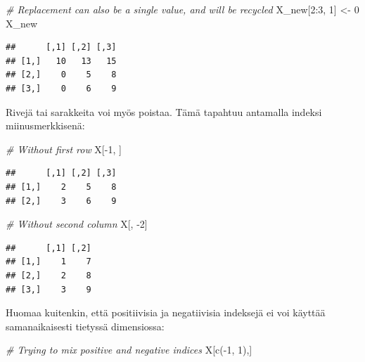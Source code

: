 \documentclass[
]{book}
\newenvironment{Shaded}{\begin{snugshade}}{\end{snugshade}}
\newcommand{\CommentTok}[1]{\textcolor[rgb]{0.56,0.35,0.01}{\textit{#1}}}
\newcommand{\DecValTok}[1]{\textcolor[rgb]{0.00,0.00,0.81}{#1}}
\newcommand{\FunctionTok}[1]{\textcolor[rgb]{0.00,0.00,0.00}{#1}}
\newcommand{\NormalTok}[1]{#1}
\newcommand{\OtherTok}[1]{\textcolor[rgb]{0.56,0.35,0.01}{#1}}
\newcommand{\SpecialCharTok}[1]{\textcolor[rgb]{0.00,0.00,0.00}{#1}}
\begin{document}
\begin{Shaded}
\begin{Highlighting}[]
\CommentTok{\# Replacement can also be a single value, and will be recycled}
\NormalTok{X\_new[}\DecValTok{2}\SpecialCharTok{:}\DecValTok{3}\NormalTok{, }\DecValTok{1}\NormalTok{] }\OtherTok{\textless{}{-}} \DecValTok{0}
\NormalTok{X\_new}
\end{Highlighting}
\end{Shaded}

\begin{verbatim}
##      [,1] [,2] [,3]
## [1,]   10   13   15
## [2,]    0    5    8
## [3,]    0    6    9
\end{verbatim}

Rivejä tai sarakkeita voi myös poistaa. Tämä tapahtuu antamalla indeksi miinusmerkkisenä:

\begin{Shaded}
\begin{Highlighting}[]
\CommentTok{\# Without first row}
\NormalTok{X[}\SpecialCharTok{{-}}\DecValTok{1}\NormalTok{, ]}
\end{Highlighting}
\end{Shaded}

\begin{verbatim}
##      [,1] [,2] [,3]
## [1,]    2    5    8
## [2,]    3    6    9
\end{verbatim}

\begin{Shaded}
\begin{Highlighting}[]
\CommentTok{\# Without second column}
\NormalTok{X[, }\SpecialCharTok{{-}}\DecValTok{2}\NormalTok{]}
\end{Highlighting}
\end{Shaded}

\begin{verbatim}
##      [,1] [,2]
## [1,]    1    7
## [2,]    2    8
## [3,]    3    9
\end{verbatim}

Huomaa kuitenkin, että positiivisia ja negatiivisia indeksejä ei voi käyttää samanaikaisesti tietyssä dimensiossa:

\begin{Shaded}
\begin{Highlighting}[]
\CommentTok{\# Trying to mix positive and negative indices}
\NormalTok{X[}\FunctionTok{c}\NormalTok{(}\SpecialCharTok{{-}}\DecValTok{1}\NormalTok{, }\DecValTok{1}\NormalTok{),]}
\end{Highlighting}
\end{Shaded}
\end{document}
